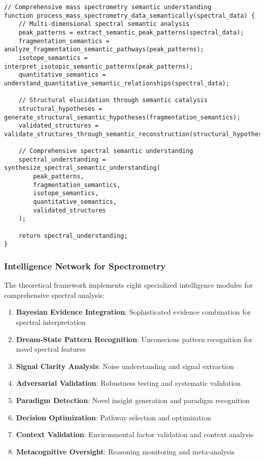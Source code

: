 \documentclass[12pt,a4paper,twoside]{article}
\begin{document}
\begin{lstlisting}[caption=Theoretical Mass Spectrometry Semantic Processing]
// Comprehensive mass spectrometry semantic understanding
function process_mass_spectrometry_data_semantically(spectral_data) {
    // Multi-dimensional spectral semantic analysis
    peak_patterns = extract_semantic_peak_patterns(spectral_data);
    fragmentation_semantics = analyze_fragmentation_semantic_pathways(peak_patterns);
    isotope_semantics = interpret_isotopic_semantic_patterns(peak_patterns);
    quantitative_semantics = understand_quantitative_semantic_relationships(spectral_data);

    // Structural elucidation through semantic catalysis
    structural_hypotheses = generate_structural_semantic_hypotheses(fragmentation_semantics);
    validated_structures = validate_structures_through_semantic_reconstruction(structural_hypotheses);

    // Comprehensive spectral semantic understanding
    spectral_understanding = synthesize_spectral_semantic_understanding(
        peak_patterns,
        fragmentation_semantics,
        isotope_semantics,
        quantitative_semantics,
        validated_structures
    );

    return spectral_understanding;
}
\end{lstlisting}

\subsubsection{Intelligence Network for Spectrometry}

The theoretical framework implements eight specialized intelligence modules for comprehensive spectral analysis:

\begin{enumerate}
\item \textbf{Bayesian Evidence Integration}: Sophisticated evidence combination for spectral interpretation
\item \textbf{Dream-State Pattern Recognition}: Unconscious pattern recognition for novel spectral features
\item \textbf{Signal Clarity Analysis}: Noise understanding and signal extraction
\item \textbf{Adversarial Validation}: Robustness testing and systematic validation
\item \textbf{Paradigm Detection}: Novel insight generation and paradigm recognition
\item \textbf{Decision Optimization}: Pathway selection and optimization
\item \textbf{Context Validation}: Environmental factor validation and context analysis
\item \textbf{Metacognitive Oversight}: Reasoning monitoring and meta-analysis
\end{enumerate}
\end{document}
